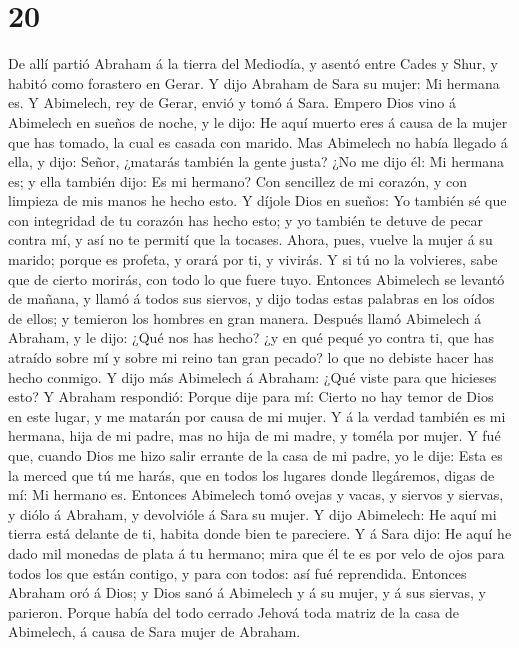 \hypertarget{section-19}{%
\section{20}\label{section-19}}

 De allí partió Abraham á la tierra del Mediodía, y asentó
entre Cades y Shur, y habitó como forastero en Gerar.  Y
dijo Abraham de Sara su mujer: Mi hermana es. Y Abimelech, rey de Gerar,
envió y tomó á Sara.  Empero Dios vino á Abimelech en
sueños de noche, y le dijo: He aquí muerto eres á causa de la mujer que
has tomado, la cual es casada con marido.  Mas Abimelech
no había llegado á ella, y dijo: Señor, ¿matarás también la gente justa?
 ¿No me dijo él: Mi hermana es; y ella también dijo: Es mi
hermano? Con sencillez de mi corazón, y con limpieza de mis manos he
hecho esto.  Y díjole Dios en sueños: Yo también sé que
con integridad de tu corazón has hecho esto; y yo también te detuve de
pecar contra mí, y así no te permití que la tocases. 
Ahora, pues, vuelve la mujer á su marido; porque es profeta, y orará por
ti, y vivirás. Y si tú no la volvieres, sabe que de cierto morirás, con
todo lo que fuere tuyo.  Entonces Abimelech se levantó de
mañana, y llamó á todos sus siervos, y dijo todas estas palabras en los
oídos de ellos; y temieron los hombres en gran manera. 
Después llamó Abimelech á Abraham, y le dijo: ¿Qué nos has hecho? ¿y en
qué pequé yo contra ti, que has atraído sobre mí y sobre mi reino tan
gran pecado? lo que no debiste hacer has hecho conmigo. 
Y dijo más Abimelech á Abraham: ¿Qué viste para que hicieses esto?
 Y Abraham respondió: Porque dije para mí: Cierto no hay
temor de Dios en este lugar, y me matarán por causa de mi mujer.
 Y á la verdad también es mi hermana, hija de mi padre,
mas no hija de mi madre, y toméla por mujer.  Y fué que,
cuando Dios me hizo salir errante de la casa de mi padre, yo le dije:
Esta es la merced que tú me harás, que en todos los lugares donde
llegáremos, digas de mí: Mi hermano es.  Entonces
Abimelech tomó ovejas y vacas, y siervos y siervas, y diólo á Abraham, y
devolvióle á Sara su mujer.  Y dijo Abimelech: He aquí mi
tierra está delante de ti, habita donde bien te pareciere.
 Y á Sara dijo: He aquí he dado mil monedas de plata á tu
hermano; mira que él te es por velo de ojos para todos los que están
contigo, y para con todos: así fué reprendida.  Entonces
Abraham oró á Dios; y Dios sanó á Abimelech y á su mujer, y á sus
siervas, y parieron.  Porque había del todo cerrado
Jehová toda matriz de la casa de Abimelech, á causa de Sara mujer de
Abraham.

